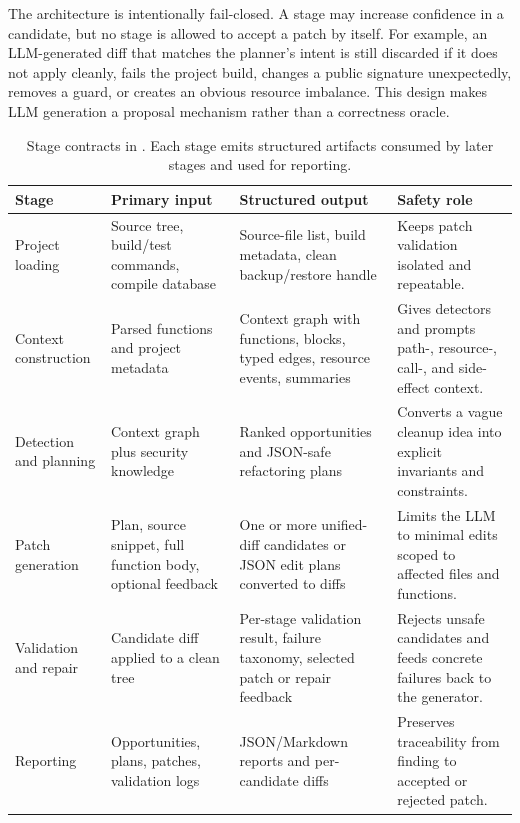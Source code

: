 The architecture is intentionally fail-closed. A stage may increase confidence
in a candidate, but no stage is allowed to accept a patch by itself. For
example, an LLM-generated diff that matches the planner's intent is still
discarded if it does not apply cleanly, fails the project build, changes a
public signature unexpectedly, removes a guard, or creates an obvious resource
imbalance. This design makes LLM generation a proposal mechanism rather than a
correctness oracle.

\begin{table}[t]
  \centering
  \caption{Stage contracts in \SysName{}. Each stage emits structured artifacts
  consumed by later stages and used for reporting.}
  \label{tab:system-stage-contracts}
  \footnotesize
  \begin{tabularx}{\textwidth}{@{}>{\raggedright\arraybackslash}p{}>{\raggedright\arraybackslash}p{}>{\raggedright\arraybackslash}p{}>{\raggedright\arraybackslash}X@{}}
    \toprule
    \textbf{Stage} & \textbf{Primary input} & \textbf{Structured output} & \textbf{Safety role} \\
    \midrule
    Project loading &
    Source tree, build/test commands, compile database &
    Source-file list, build metadata, clean backup/restore handle &
    Keeps patch validation isolated and repeatable. \\
    Context construction &
    Parsed functions and project metadata &
    Context graph with functions, blocks, typed edges, resource events, summaries &
    Gives detectors and prompts path-, resource-, call-, and side-effect context. \\
    Detection and planning &
    Context graph plus security knowledge &
    Ranked opportunities and JSON-safe refactoring plans &
    Converts a vague cleanup idea into explicit invariants and constraints. \\
    Patch generation &
    Plan, source snippet, full function body, optional feedback &
    One or more unified-diff candidates or JSON edit plans converted to diffs &
    Limits the LLM to minimal edits scoped to affected files and functions. \\
    Validation and repair &
    Candidate diff applied to a clean tree &
    Per-stage validation result, failure taxonomy, selected patch or repair feedback &
    Rejects unsafe candidates and feeds concrete failures back to the generator. \\
    Reporting &
    Opportunities, plans, patches, validation logs &
    JSON/Markdown reports and per-candidate diffs &
    Preserves traceability from finding to accepted or rejected patch. \\
    \bottomrule
  \end{tabularx}
\end{table}

